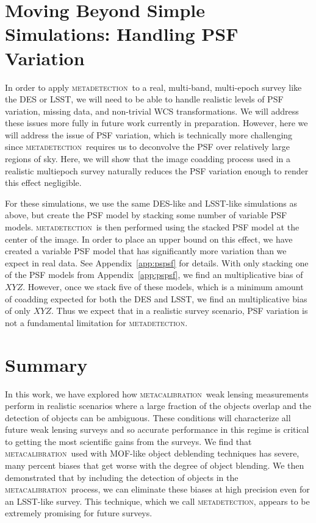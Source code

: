 \documentclass[fleqn,useAMS,usenatbib]{mnras}
\newcommand{\mcal}{\textsc{metacalibration}}
\newcommand{\mdet}{\textsc{metadetection}}
\begin{document}
\section{Moving Beyond Simple Simulations: Handling PSF Variation}

In order to apply \mdet\ to a real, multi-band, multi-epoch survey like the
DES or LSST, we will need to be able to handle realistic levels of PSF variation,
missing data, and non-trivial WCS transformations. We will address these issues
more fully in future work currently in preparation. However, here we will address
the issue of PSF variation, which is technically more challenging since \mdet\
requires us to deconvolve the PSF over relatively large regions of sky. Here, we
will show that the image coadding process used in a realistic multiepoch survey
naturally reduces the PSF variation enough to render this effect negligible.

For these simulations, we use the same DES-like and LSST-like simulations as above,
but create the PSF model by stacking some number of variable PSF models. \mdet\ is then
performed using the stacked PSF model at the center of the image. In order
to place an upper bound on this effect, we have created a variable PSF model that
has significantly more variation than we expect in real data. See Appendix~\ref{app:pspsf}
for details. With only stacking one of the PSF models from Appendix~\ref{app:pspsf},
we find an multiplicative bias of $XYZ$. However, once we stack five of these models,
which is a minimum amount of coadding expected for both the DES and LSST, we find
an multiplicative bias of only $XYZ$. Thus we expect that in a realistic survey
scenario, PSF variation is not a fundamental limitation for \mdet.


\section{Summary}

In this work, we have explored how \mcal\ weak lensing measurements perform in
realistic scenarios where a large fraction of the objects overlap and the detection
of objects can be ambiguous. These conditions will characterize all future weak
lensing surveys and so accurate performance in this regime is critical to getting
the most scientific gains from the surveys. We find that \mcal\ used with MOF-like
object deblending techniques has severe, many percent biases that get worse with
the degree of object blending. We then demonstrated that by including the detection
of objects in the \mcal\ process, we can eliminate these biases at high precision
even for an LSST-like survey. This technique, which we call \mdet, appears to be
extremely promising for future surveys.
\end{document}
